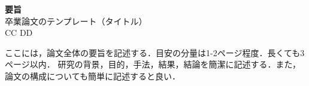 \documentclass[../main/main]{subfiles}
\begin{document}
\begin{center}
\vspace{50truept}
{\Large \textbf{要旨}}\\
\vspace{40truept}
{\huge 卒業論文のテンプレート（タイトル）}\\ %
\vspace{20truept}
{\large CC DD}\\ %
\vspace{40truept}
\end{center}
\par
ここには，論文全体の要旨を記述する．目安の分量は1-2ページ程度．長くても3ページ以内．
研究の背景，目的，手法，結果，結論を簡潔に記述する．また，論文の構成についても簡単に記述すると良い．

\end{document}
